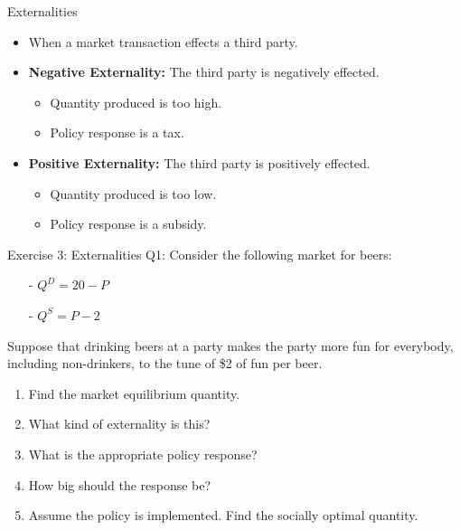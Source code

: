 \documentclass[9pt, handout]{beamer}
\begin{document}
\begin{frame}{Externalities}
    \begin{itemize}
        \item When a market transaction effects a third party.
        \vspace{5pt}
        \item \textbf{Negative Externality:} The third party is negatively effected.
        \vspace{3pt}
        \begin{itemize}
            \item Quantity produced is too high.
            \item Policy response is a tax.
        \end{itemize}
        \vspace{5pt}
        \item \textbf{Positive Externality:} The third party is positively effected.
        \vspace{3pt}
        \begin{itemize}
            \item Quantity produced is too low.
            \item Policy response is a subsidy.
        \end{itemize}
    \end{itemize}
\end{frame}

\begin{frame}{Exercise 3: Externalities}
    Q1: Consider the following market for beers:
    \begin{itemize}
        \item[-] $Q^D = 20 - P$
        \item[-] $Q^S = P - 2$
    \end{itemize}
    Suppose that drinking beers at a party makes the party more fun for everybody, including non-drinkers, to the tune of \$2 of fun per beer.
    \vspace{5pt}
    \begin{enumerate}
        \item Find the market equilibrium quantity.
        \item What kind of externality is this?
        \item What is the appropriate policy response?
        \item How big should the response be? 
        \item Assume the policy is implemented. Find the socially optimal quantity.
    \end{enumerate}
    \vspace{1in}
\end{frame}
\end{document}
